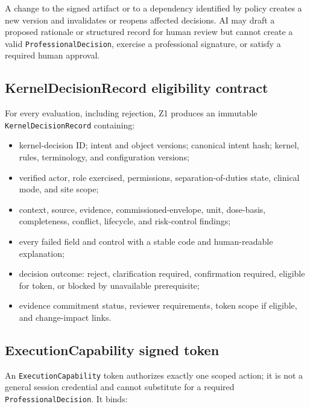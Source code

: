 \documentclass[11pt,letterpaper]{article}
\begin{document}
A change to the signed artifact or to a dependency identified by policy creates a new version and invalidates or reopens affected decisions. AI may draft a proposed rationale or structured record for human review but cannot create a valid \texttt{ProfessionalDecision}, exercise a professional signature, or satisfy a required human approval.

\subsection{KernelDecisionRecord eligibility contract}

For every evaluation, including rejection, Z1 produces an immutable \texttt{KernelDecisionRecord} containing:

\begin{itemize}
\item kernel-decision ID; intent and object versions; canonical intent hash; kernel, rules, terminology, and configuration versions;
\item verified actor, role exercised, permissions, separation-of-duties state, clinical mode, and site scope;
\item context, source, evidence, commissioned-envelope, unit, dose-basis, completeness, conflict, lifecycle, and risk-control findings;
\item every failed field and control with a stable code and human-readable explanation;
\item decision outcome: reject, clarification required, confirmation required, eligible for token, or blocked by unavailable prerequisite;
\item evidence commitment status, reviewer requirements, token scope if eligible, and change-impact links.
\end{itemize}

\subsection{ExecutionCapability signed token}

An \texttt{ExecutionCapability} token authorizes exactly one scoped action; it is not a general session credential and cannot substitute for a required \texttt{ProfessionalDecision}. It binds:
\end{document}

